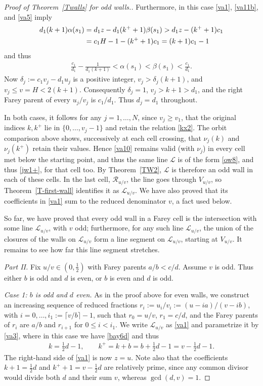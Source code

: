 \documentclass[11pt,reqno,tbtags,a4paper]{amsart}
\numberwithin{equation}{section}
\renewcommand\le{\leq}
\renewcommand\ge{\geq}
\renewcommand\leq{\leqslant}
\renewcommand\geq{\geqslant}
\theoremstyle{plain}%
\theoremstyle{definition}
\theoremstyle{remark}
\newcounter{cases}
\newcommand\pfcase[2]{\smallskip\noindent\emph{Case #1: #2} \noindent}
\newcommand{\refT}[1]{Theorem~\ref{#1}}
\newcommand\set[1]{\ensuremath{\{#1\}}}
\newcommand\ceil[1]{\lceil#1\rceil}
\newcounter{cc}
\newcommand\ga{\alpha}
\newcommand\gb{\beta}
\newcommand\LL{{\mathcal L}}
\newcommand\cR{{\mathcal R}}
\newcommand\uv{_{u/v}}
\newcommand\kx{{k^+}}
\newcommand\0{{\boldsymbol 0}}
\newcommand\1{{\boldsymbol 1}}
\begin{document}
\begin{proof}[Proof of \refT{Twalls} for odd walls.]
%
Furthermore, in this case
\eqref{va1}, \eqref{va11b}, and \eqref{va5} imply
\begin{align}\label{va73b}
  d_1(k+1)\ga(s_1)&
=d_1z-d_1(\kx+1)\gb(s_1)
>d_1z-(\kx+1)c_1
\notag\\&
=c_1H-1-(\kx+1)c_1
=(k+1)c_1-1
\end{align}
and thus
\begin{align}\label{va12b}
 \frac{c_1}{d_1}-\frac{1}{d_1(k+1)}
 <\ga(s_1)<\gb(s_1)<\frac{c_1}{d_1}.
\end{align}
Now $\delta_j:=c_1v_j-d_1u_j$ is a positive integer,
$v_j>\delta_j(k+1)$, and $v_j\le v=H<2(k+1)$.
Consequently $\delta_j=1$, $v_j>k+1>d_1$, and the right Farey parent
of every $u_j/v_j$ is $c_1/d_1$.
Thus $d_j=d_1$ throughout.

In both cases, 
it follows for any $j=1,\dots,N$,
since $v_j\ge v_1$, that 
the original indices $k,\kx$ lie in
$\set{0,\dots,v_j-1}$ and retain the relation \eqref{kx2}.
The orbit comparison above shows, successively at each cell crossing,
that $\nu_j(k)$ and $\nu_j(\kx)$ retain their values.
Hence \eqref{va10} remains valid (with $\nu_j$)
in every cell met below the starting point, 
and thus the same line $\LL$ is of the form \eqref{ow8}, 
and thus \eqref{jw1+}, for that cell too. 
By \refT{TW2}, $\LL$ is therefore an odd wall in each of these cells.
In the last cell, $\cR\uv$, the line goes through $V\uv$, so
\refT{T-first-wall} identifies it as $\LL\uv$.
We have also proved that its coefficients in \eqref{va1} sum to the
reduced denominator $v$, a fact used below.

So far, we have proved that every odd wall in a Farey cell is the
intersection with some line $\LL\uv$, with $v$ odd; 
furthermore, for any such line $\LL\uv$, 
the union of the closures of the walls on $\LL\uv$ form a line segment on
$\LL\uv$, starting at $V\uv$. It remains to see how far this line segment
stretches.

\bigskip
\medskip
\noindent\emph{Part II.}
Fix $u/v\in(0,\frac12)$ with Farey parents $a/b<c/d$.
Assume $v$ is odd. Thus either $b$ is odd and $d$ is even, or $b$ is even and
$d$ is odd.

%

\pfcase1{$b$ is odd and $d$ even.}
As in the proof above for even walls,
we construct an increasing sequence of reduced fractions
$r_i:=u_i/v_i:=(u-ia)/(v-ib)$, with $i=0,\dots,i_1:=\ceil{v/b}-1$, such that
$r_0=u/v$, $r_1=c/d$, and
the Farey parents of $r_i$ are $a/b$ and $r_{i+1}$ for $0\le i<i_1$.
We write $\LL\uv$ as \eqref{va1} and parametrize it by
\eqref{va3}, where in this case
we have \eqref{bay6d} and thus
\begin{align}\label{vb1}
 k=\tfrac12d-1,\qquad
 \kx=k+b=b+\tfrac12d-1=v-\tfrac12d-1.
\end{align}
The right-hand side of \eqref{va1} is now $z=u$.
Note also that the coefficients $k+1=\frac12d$ and
$\kx+1=v-\frac12d$ are relatively prime,
since any common divisor would divide both $d$ and their sum $v$,
whereas $\gcd(d,v)=1$.


\end{proof}
\end{document}
